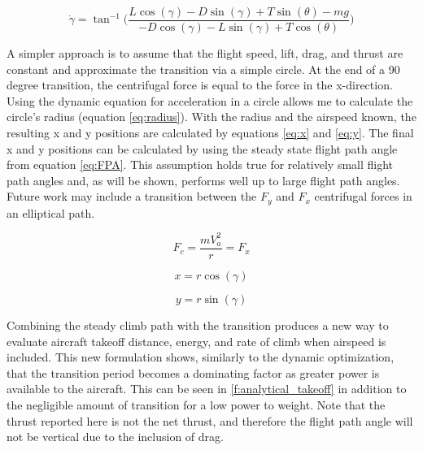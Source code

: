 \documentclass[10pt,english]{article}
\begin{document}
\begin{equation}
\label{eq:angledot}
\dot{\gamma} = \tan^{-1} \Bigg(\frac{L \cos(\gamma) - D \sin(\gamma) + T \sin(\theta)- m g}{-D \cos(\gamma) - L \sin(\gamma) + T \cos(\theta)}\Bigg)
\end{equation}

\vspace{10pt}
A simpler approach is to assume that the flight speed, lift, drag, and thrust are constant and approximate the transition via a simple circle.  At the end of a 90 degree transition, the centrifugal force is equal to the force in the x-direction.  Using the dynamic equation for acceleration in a circle allows me to calculate the circle's radius (equation \ref{eq:radius}).  With the radius and the airspeed known, the resulting x and y positions are calculated by equations \ref{eq:x} and \ref{eq:y}.  The final x and y positions can be calculated by using the steady state flight path angle from equation \ref{eq:FPA}.  This assumption holds true for relatively small flight path angles and, as will be shown, performs well up to large flight path angles.  Future work may include a transition between the $F_y$ and $F_x$ centrifugal forces in an elliptical path.

\begin{equation}
\label{eq:radius}
F_c = \frac{m V_a^2}{r} = F_x
\end{equation}

%



\begin{equation}
\label{eq:x}
x = r \cos(\gamma)
\end{equation}

\begin{equation}
\label{eq:y}
y = r \sin(\gamma)
\end{equation}

\vspace{10pt}
Combining the steady climb path with the transition produces a new way to evaluate aircraft takeoff distance, energy, and rate of climb when airspeed is included.  This new formulation shows, similarly to the dynamic optimization, that the transition period becomes a dominating factor as greater power is available to the aircraft.  This can be seen in \cref{f:analytical_takeoff} in addition to the negligible amount of transition for a low power to weight. Note that the thrust reported here is not the net thrust, and therefore the flight path angle will not be vertical due to the inclusion of drag.
\vspace{10pt}
\end{document}
